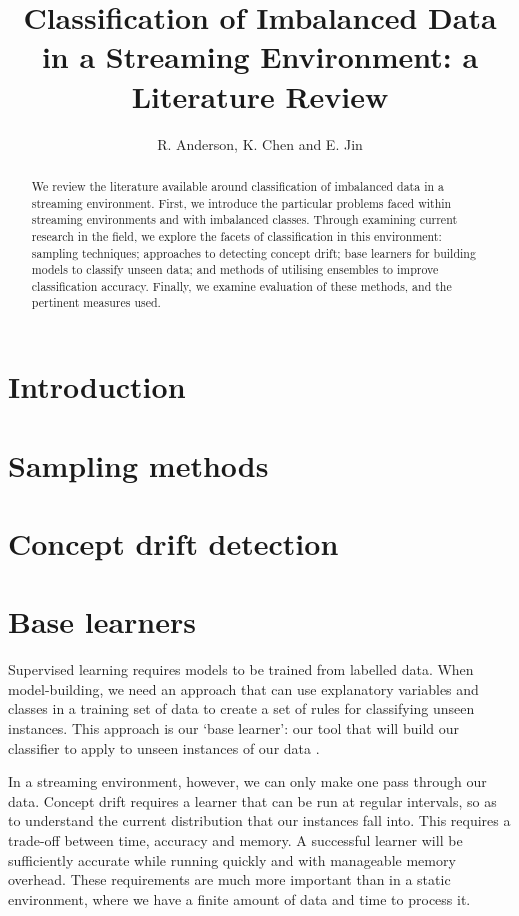 \documentclass[10pt]{article}
\title{Classification of Imbalanced Data in a Streaming Environment: a Literature Review}
\author{R. Anderson, K. Chen and E. Jin}
\begin{document}
\maketitle

\begin{abstract}
We review the literature available around classification of imbalanced data in a streaming environment. First, we introduce the particular problems faced within streaming environments and with imbalanced classes. Through examining current research in the field, we explore the facets of classification in this environment: sampling techniques; approaches to detecting concept drift; base learners for building models to classify unseen data; and methods of utilising ensembles to improve classification accuracy. Finally, we examine evaluation of these methods, and the pertinent measures used.
\end{abstract}

\section{Introduction}
\section{Sampling methods}
\section{Concept drift detection}
\section{Base learners}

Supervised learning requires models to be trained from labelled data. When model-building, we need an approach that can use explanatory variables and classes in a training set of data to create a set of rules for classifying unseen instances. This approach is our ‘base learner’: our tool that will build our classifier to apply to unseen instances of our data \cite{hoe12}.

In a streaming environment, however, we can only make one pass through our data. Concept drift requires a learner that can be run at regular intervals, so as to understand the current distribution that our instances fall into. This requires a trade-off between time, accuracy and memory. A successful learner will be sufficiently accurate while running quickly and with manageable memory overhead. These requirements are much more important than in a static environment, where we have a finite amount of data and time to process it.
\end{document}
